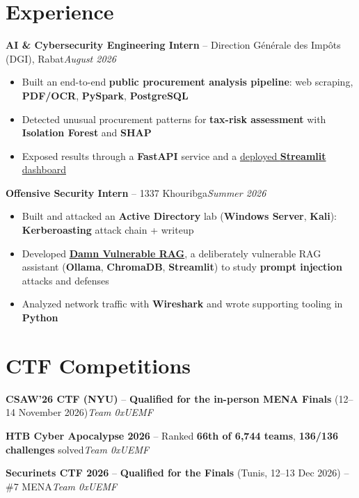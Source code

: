\documentclass[10pt,a4paper]{article}
\newcommand{\lnk}[2]{\href{#1}{\color{linkblue}#2}}
\begin{document}
\section{Experience}
\textbf{AI \& Cybersecurity Engineering Intern} -- Direction Générale des Impôts (DGI), Rabat\hfill\textit{\small August 2026}
\begin{itemize}
  \item Built an end-to-end \textbf{public procurement analysis pipeline}: web scraping, \textbf{PDF/OCR}, \textbf{PySpark}, \textbf{PostgreSQL}
  \item Detected unusual procurement patterns for \textbf{tax-risk assessment} with \textbf{Isolation Forest} and \textbf{SHAP}
  \item Exposed results through a \textbf{FastAPI} service and a \lnk{https://public-procurement-intelligence.streamlit.app/}{deployed \textbf{Streamlit} dashboard}
\end{itemize}
\textbf{Offensive Security Intern} -- 1337 Khouribga\hfill\textit{\small Summer 2026}
\begin{itemize}
  \item Built and attacked an \textbf{Active Directory} lab (\textbf{Windows Server}, \textbf{Kali}): \textbf{Kerberoasting} attack chain + writeup
  \item Developed \lnk{https://github.com/kdeeey/damn-vulnerable-rag}{\textbf{Damn Vulnerable RAG}}, a deliberately vulnerable RAG assistant (\textbf{Ollama}, \textbf{ChromaDB}, \textbf{Streamlit}) to study \textbf{prompt injection} attacks and defenses
  \item Analyzed network traffic with \textbf{Wireshark} and wrote supporting tooling in \textbf{Python}
\end{itemize}

\section{CTF Competitions}
\textbf{CSAW'26 CTF (NYU)} -- \textbf{Qualified for the in-person MENA Finals} (12--14 November 2026)\hfill\textit{\small Team 0xUEMF}\par
\textbf{HTB Cyber Apocalypse 2026} -- Ranked \textbf{66th of 6,744 teams}, \textbf{136/136 challenges} solved\hfill\textit{\small Team 0xUEMF}\par
\textbf{Securinets CTF 2026} -- \textbf{Qualified for the Finals} (Tunis, 12--13 Dec 2026) -- \#7 MENA\hfill\textit{\small Team 0xUEMF}\par
\end{document}
